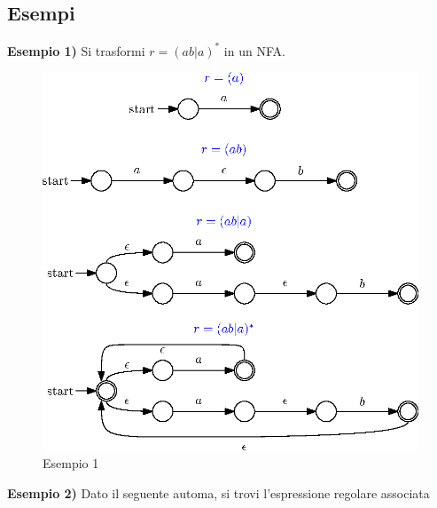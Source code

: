 \documentclass[10pt, letterpaper]{report}
\begin{document}
\subsection{Esempi} 
\textbf{Esempio 1)} Si trasformi $r=(ab|a)^*$ in un NFA.\begin{center}
    \begin{figure}[h!]
        \centering 
        \includegraphics[width=1\textwidth ]{images/esempio1Regex.eps}
        \caption{Esempio 1}
        \label{fig:es1Regex}
    \end{figure}
\end{center}\newpage
\textbf{Esempio 2)} Dato il seguente automa, si trovi l'espressione regolare associata 
\end{document}
